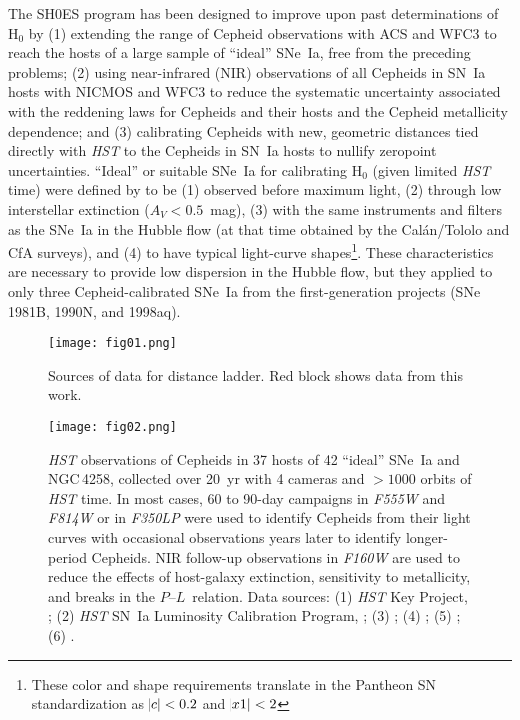 \documentclass[12pt]{aastex631}
\newcommand{\PLs}{$P$--$L$\ }
\begin{document}
The SH0ES program has been designed to improve upon past determinations of H$_0$ by (1) extending the range of Cepheid observations with ACS and WFC3 to reach the hosts of a large sample of ``ideal'' SNe~Ia, free from the preceding problems; (2) using near-infrared (NIR) observations of all Cepheids in SN~Ia hosts with NICMOS and WFC3 to reduce the systematic uncertainty associated with the reddening laws for Cepheids and their hosts and the Cepheid metallicity dependence; and (3) calibrating Cepheids with new, geometric distances tied directly with {\it HST} to the Cepheids in SN~Ia hosts to nullify zeropoint uncertainties.  ``Ideal'' or suitable SNe~Ia for calibrating H$_0$ (given limited {\it HST} time)  were defined by \cite{riess05} to be (1) observed before maximum light, (2) through low interstellar extinction ($A_V < 0.5$~mag), (3) with the same instruments and filters as the SNe~Ia in the Hubble flow (at that time obtained by the Cal\'an/Tololo and CfA surveys), and (4) to have typical light-curve shapes\footnote{These color and shape requirements translate in the Pantheon SN standardization \citep{Scolnic:2018} as $\abs{c}<0.2$ and $\abs{x1} < 2$}. These characteristics are necessary to provide low dispersion in the Hubble flow, but they applied to only three Cepheid-calibrated SNe~Ia from the first-generation projects (SNe 1981B, 1990N, and 1998aq).

\begin{figure}[b]
\begin{center}
\texttt{[image: fig01.png]}
\end{center}
\caption{\label{fg:datasrc} Sources of data for distance ladder. Red block shows data from this work.}
\end{figure}

\begin{figure}[b]
\texttt{[image: fig02.png]}
\caption{\label{fg:hstobs} {\it HST} observations of Cepheids in 37 hosts of 42 ``ideal'' SNe~Ia and NGC$\,$4258, collected over 20~yr with 4 cameras and $>1000$ orbits of {\it HST} time.  In most cases, 60 to 90-day campaigns in {\it F555W} and {\it F814W} or in {\it F350LP} were used to identify Cepheids from their light curves with occasional observations years later to identify longer-period Cepheids.  NIR follow-up observations in {\it F160W} are used to reduce the effects of host-galaxy extinction, sensitivity to metallicity, and breaks in the \PLs relation. Data sources: (1) {\it HST} Key Project, \citet{freedman01}; (2) {\it HST} SN~Ia Luminosity Calibration Program, \citet{sandage06}; (3) \citet{riess05}; (4) \citet{macri06}; (5) \citet{Mager:2013}; (6) \citet{Yuan:2021_N4258}.}
\end{figure}
\end{document}
